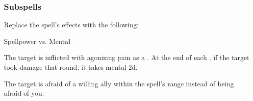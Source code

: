 \subsubsection{Subspells}





Replace the spell's effects with the following:
\begin{spellcontent}

\begin{augmenteffects}




\begin{spellattack}{Spellpower vs. Mental}


\spellsuccess
The target is inflicted with agonizing pain as a .
At the end of each , if the target took damage that round, it takes mental  \minus2d.



\end{spellattack}





\end{augmenteffects}

\end{spellcontent}






The target is afraid of a willing ally within the spell's range instead of being afraid of you.










